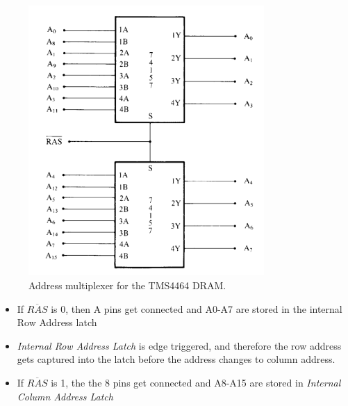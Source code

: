 \begin{figure}[h!]
  \includegraphics[width = 0.8\textwidth]{./figures/RAS.png}
  \caption{Address multiplexer for the TMS4464 DRAM.}
  \label{}
\end{figure}
\begin{itemize}
  \item If $\overline{RAS}$ is 0, then A pins get connected and A0-A7 are stored in the internal Row Address latch
  \item \textit{Internal Row Address Latch} is edge triggered, and therefore the row address gets captured into the latch before the address changes to column address.
  \item If $\overline{RAS}$ is 1, the the 8 pins get connected and A8-A15 are stored in \textit{Internal Column Address Latch} 
\end{itemize}
